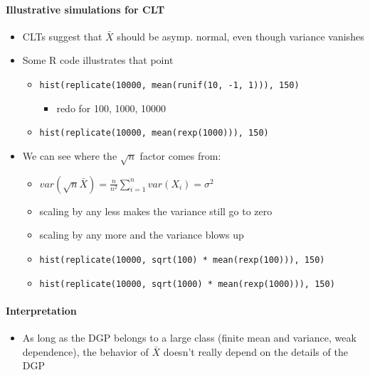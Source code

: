 \paragraph{Illustrative simulations for CLT}
\begin{itemize}
\item CLTs suggest that $\bar X$ should be asymp. normal, even though variance vanishes
\item Some R code illustrates that point
\begin{itemize}
\item \texttt{hist(replicate(10000, mean(runif(10, -1, 1))), 150)}
\begin{itemize}
\item redo for 100, 1000, 10000
\end{itemize}
\item \texttt{hist(replicate(10000, mean(rexp(1000))), 150)}
\end{itemize}
\item We can see where the $\sqrt{n}$ factor comes from:
\begin{itemize}
\item $var(\sqrt{n} \bar X) = \frac{n}{n^2} \sum_{i=1}^n var(X_i) = \sigma^2$
\item scaling by any less makes the variance still go to zero
\item scaling by any more and the variance blows up
\item \texttt{hist(replicate(10000, sqrt(100) * mean(rexp(100))), 150)}
\item \texttt{hist(replicate(10000, sqrt(1000) * mean(rexp(1000))), 150)}
\end{itemize}
\end{itemize}

\paragraph{Interpretation}
\begin{itemize}
\item As long as the DGP belongs to a large class (finite mean and
        variance, weak dependence), the behavior of $\bar X$ doesn't
        really depend on the details of the DGP
\end{itemize}

